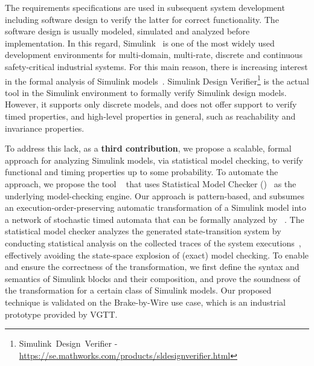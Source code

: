 The requirements specifications are used in subsequent system development including software design to verify the latter for correct functionality. The software design is usually modeled, simulated and analyzed before implementation. In this regard, Simulink~\cite{JamesB.Dabney2003MasteringSimulink} is one of the most widely used development environments for multi-domain, multi-rate, discrete and continuous safety-critical industrial systems. For this main reason, there is increasing interest in the formal analysis of Simulink models~\cite{Manamcheri2011AModels}. Simulink Design Verifier\footnote{Simulink~Design~Verifier - \url{https://se.mathworks.com/products/sldesignverifier.html}} is the actual tool in the Simulink environment to formally verify Simulink design models. However, it supports only discrete models, and does not offer support to verify timed properties, and high-level properties in general, such as reachability and invariance properties.
 
To address this lack, as a \textbf{third contribution}, we propose a scalable, formal approach for analyzing Simulink models, via statistical model checking, to verify functional and timing properties up to some probability. To automate the approach, we propose the tool \simppaal~\cite{Filipovikj2016SimulinkSystems}\cite{Filipovikj4714} that uses \uppaal{} Statistical Model Checker (\uppaalsmc)~\cite{Bulychev2012UPPAAL-SMC:Automata} as the underlying model-checking engine. Our approach is pattern-based, and subsumes an execution-order-preserving automatic transformation of a Simulink model into a network of stochastic timed automata that can be formally analyzed by \uppaalsmc~\cite{Filipovikj2016SimulinkSystems}. The statistical model checker analyzes the generated state-transition system by conducting statistical analysis on the collected traces of the system executions~\cite{Legay2010StatisticalOverview}, effectively avoiding the state-space explosion of (exact) model checking. To enable and ensure the correctness of the transformation, we first define the syntax and semantics of Simulink blocks and their composition, and prove the soundness of the transformation for a certain class of Simulink models. Our proposed technique is validated on the Brake-by-Wire use case, which is an industrial prototype provided by VGTT.
 
